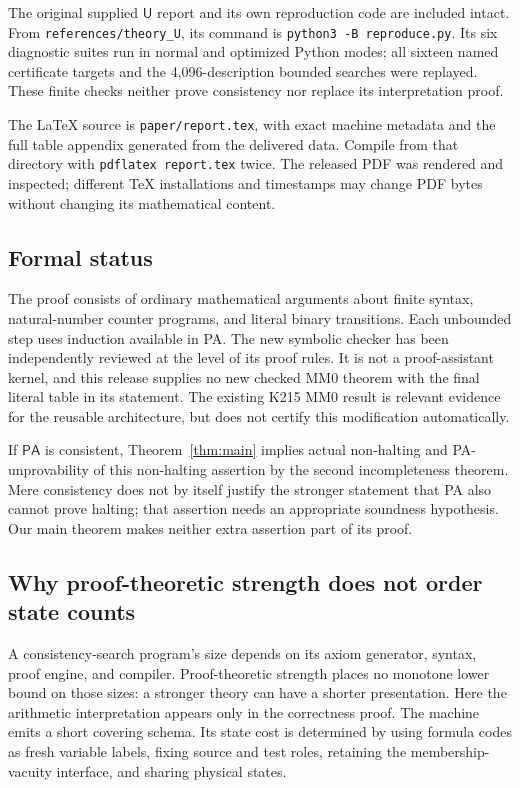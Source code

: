\documentclass[11pt]{article}
\newcommand{\PA}{\mathsf{PA}}
\newcommand{\ThU}{\mathsf U}
\theoremstyle{definition}\newtheorem{definition}[theorem]{Definition}
\begin{document}
The original supplied $\ThU$ report and its own reproduction code are
included intact. From \texttt{references/theory\_U}, its command is
\texttt{python3 -B reproduce.py}. Its six diagnostic suites run in normal
and optimized Python modes; all sixteen named certificate targets and
the 4,096-description bounded searches were replayed. These finite
checks neither prove consistency nor replace its interpretation proof.

The LaTeX source is \texttt{paper/report.tex}, with exact machine metadata
and the full table appendix generated from the delivered data. Compile
from that directory with \texttt{pdflatex report.tex} twice. The released
PDF was rendered and inspected; different TeX installations and timestamps
may change PDF bytes without changing its mathematical content.

\subsection{Formal status}

The proof consists of ordinary mathematical arguments about finite syntax,
natural-number counter programs, and literal binary transitions. Each
unbounded step uses induction available in PA. The new symbolic checker
has been independently reviewed at the level of its proof rules. It is
not a proof-assistant kernel, and this release supplies no new checked
MM0 theorem with the final literal table in its statement. The existing
K215 MM0 result is relevant evidence for the reusable architecture, but
does not certify this modification automatically.

If $\PA$ is consistent, Theorem~\ref{thm:main} implies actual non-halting
and PA-unprovability of this non-halting assertion by the second
incompleteness theorem. Mere consistency does not by itself justify the
stronger statement that PA also cannot prove halting; that assertion needs
an appropriate soundness hypothesis. Our main theorem makes neither
extra assertion part of its proof.

\subsection{Why proof-theoretic strength does not order state counts}

A consistency-search program's size depends on its axiom generator,
syntax, proof engine, and compiler. Proof-theoretic strength places no
monotone lower bound on those sizes: a stronger theory can have a shorter
presentation. Here the arithmetic interpretation appears only in the
correctness proof. The machine emits a short covering schema. Its state
cost is determined by using formula codes as fresh variable labels,
fixing source and test roles, retaining the membership-vacuity interface,
and sharing physical states.
\end{document}
